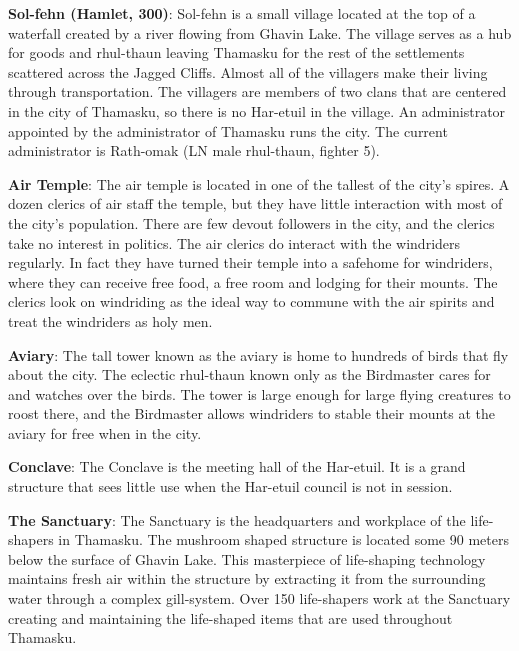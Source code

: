 {
	\textbf{Sol-fehn (Hamlet, 300)}: Sol-fehn is a small village located at the top of a waterfall created by a river flowing from Ghavin Lake. The village serves as a hub for goods and rhul-thaun leaving Thamasku for the rest of the settlements scattered across the Jagged Cliffs. Almost all of the villagers make their living through transportation. The villagers are members of two clans that are centered in the city of Thamasku, so there is no Har-etuil in the village. An administrator appointed by the administrator of Thamasku runs the city. The current administrator is Rath-omak (LN male rhul-thaun, fighter 5).
}
{
	\textbf{Air Temple}: The air temple is located in one of the tallest of the city's spires. A dozen clerics of air staff the temple, but they have little interaction with most of the city's population. There are few devout followers in the city, and the clerics take no interest in politics. The air clerics do interact with the windriders regularly. In fact they have turned their temple into a safehome for windriders, where they can receive free food, a free room and lodging for their mounts. The clerics look on windriding as the ideal way to commune with the air spirits and treat the windriders as holy men.

	\textbf{Aviary}: The tall tower known as the aviary is home to hundreds of birds that fly about the city. The eclectic rhul-thaun known only as the Birdmaster cares for and watches over the birds. The tower is large enough for large flying creatures to roost there, and the Birdmaster allows windriders to stable their mounts at the aviary for free when in the city.

	\textbf{Conclave}: The Conclave is the meeting hall of the Har-etuil. It is a grand structure that sees little use when the Har-etuil council is not in session.

	\textbf{The Sanctuary}: The Sanctuary is the headquarters and workplace of the life-shapers in Thamasku. The mushroom shaped structure is located some 90 meters below the surface of Ghavin Lake. This masterpiece of life-shaping technology maintains fresh air within the structure by extracting it from the surrounding water through a complex gill-system. Over 150 life-shapers work at the Sanctuary creating and maintaining the life-shaped items that are used throughout Thamasku.
}
